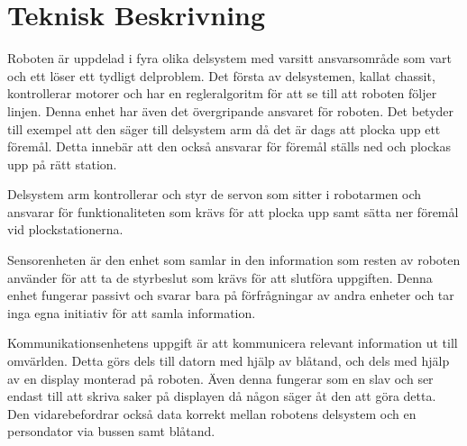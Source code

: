
\section{Teknisk Beskrivning}

Roboten är uppdelad i fyra olika delsystem med varsitt ansvarsområde som vart och ett löser ett tydligt delproblem. Det första av delsystemen, kallat chassit, kontrollerar motorer och har en regleralgoritm för att se till att roboten följer linjen. Denna enhet har även det övergripande ansvaret för roboten. Det betyder till exempel att den säger till delsystem arm då det är dags att plocka upp ett föremål. Detta innebär att den också ansvarar för föremål ställs ned och plockas upp på rätt station.

Delsystem arm kontrollerar och styr de servon som sitter i robotarmen och ansvarar för funktionaliteten som krävs för att plocka upp samt sätta ner föremål vid plockstationerna.

Sensorenheten är den enhet som samlar in den information som resten av roboten använder för att ta de styrbeslut som krävs för att slutföra uppgiften. Denna enhet fungerar passivt och svarar bara på förfrågningar av andra enheter och tar inga egna initiativ för att samla information.

Kommunikationsenhetens uppgift är att kommunicera relevant information ut till omvärlden. Detta görs dels till datorn med hjälp av blåtand, och dels med hjälp av en display monterad på roboten. Även denna fungerar som en slav och ser endast till att skriva saker på displayen då någon säger åt den att göra detta. Den vidarebefordrar också data korrekt mellan robotens delsystem och en persondator via bussen samt blåtand.



